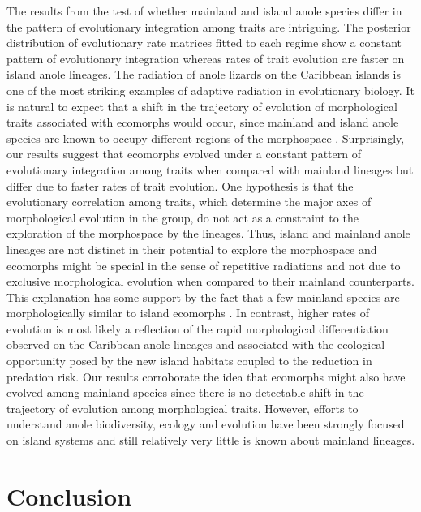 The results from the test of whether mainland and island anole species differ in the pattern of evolutionary integration among traits are intriguing. The posterior distribution of evolutionary rate matrices fitted to each regime show a constant pattern of evolutionary integration whereas rates of trait evolution are faster on island anole lineages. The radiation of anole lizards on the Caribbean islands is one of the most striking examples of adaptive radiation in evolutionary biology. It is natural to expect that a shift in the trajectory of evolution of morphological traits associated with ecomorphs would occur, since mainland and island anole species are known to occupy different regions of the morphospace \citep{pinto_testing_2008, schaad_patterns_2010, moreno-arias_patterns_2016}. Surprisingly, our results suggest that ecomorphs evolved under a constant pattern of evolutionary integration among traits when compared with mainland lineages but differ due to faster rates of trait evolution. One hypothesis is that the evolutionary correlation among traits, which determine the major axes of morphological evolution in the group, do not act as a constraint to the exploration of the morphospace by the lineages.  Thus, island and mainland anole lineages are not distinct in their potential to explore the morphospace and ecomorphs might be special in the sense of repetitive radiations and not due to exclusive morphological evolution when compared to their mainland counterparts. This explanation has some support by the fact that a few mainland species are morphologically similar to island ecomorphs \citep{schaad_patterns_2010}. In contrast, higher rates of evolution is most likely a reflection of the rapid morphological differentiation observed on the Caribbean anole lineages and associated with the ecological opportunity posed by the new island habitats coupled to the reduction in predation risk. Our results corroborate the idea that ecomorphs might also have evolved among mainland species since there is no detectable shift in the trajectory of evolution among morphological traits. However, efforts to understand anole biodiversity, ecology and evolution have been strongly focused on island systems and still relatively very little is known about mainland lineages.

\section{Conclusion}

